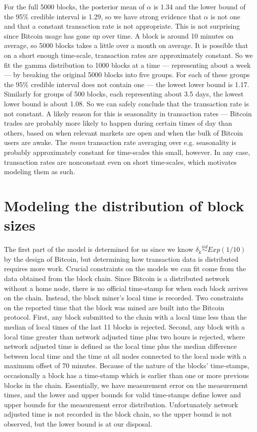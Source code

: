 \documentclass{article}
\begin{document}
For the full 5000 blocks, the posterior mean of $\alpha$ is 1.34 and the lower bound of the 95\% credible interval is 1.29, so we have strong evidence that $\alpha$ is not one and that a constant transaction rate is not appropriate. This is not surprising since Bitcoin usage has gone up over time. A block is around 10 minutes on average, so 5000 blocks takes a little over a month on average. It is possible that on a short enough time-scale, transaction rates are approximately constant. So we fit the gamma distribution to 1000 blocks at a time --- representing about a week --- by breaking the original 5000 blocks into five groups. For each of these groups the 95\% credible interval does not contain one --- the lowest lower bound is 1.17. Similarly for groups of 500 blocks, each representing about 3.5 days, the lowest lower bound is about 1.08. So we can safely conclude that the transaction rate is not constant. A likely reason for this is seasonality in transaction rates --- Bitcoin trades are probably more likely to happen during certain times of day than others, based on when relevant markets are open and when the bulk of Bitcoin users are awake. The {\it mean} transaction rate averaging over e.g. seasonality is probably approximately constant for time-scales this small, however. In any case, transaction rates are nonconstant even on short time-scales, which motivates modeling them as such.

\section{Modeling the distribution of block sizes}

The first part of the model is determined for us since we know $\delta_k\stackrel{iid}{\sim} Exp(1/10)$ by the design of Bitcoin, but determining how transaction data is distributed requires more work. Crucial constraints on the models we can fit come from the data obtained from the block chain. Since Bitcoin is a distributed network without a home node, there is no official time-stamp for when each block arrives on the chain. Instead, the block miner's local time is recorded. Two constraints on the reported time that the block was mined are built into the Bitcoin protocol. First, any block submitted to the chain with a local time less than the median of local times of the last 11 blocks is rejected. Second, any block with a local time greater than network adjusted time plus two hours is rejected, where network adjusted time is defined as the local time plus the median difference between local time and the time at all nodes connected to the local node with a maximum offset of 70 minutes. Because of the nature of the blocks' time-stamps, occasionally a block has a time-stamp which is earlier than one or more previous blocks in the chain. Essentially, we have measurement error on the measurement times, and the lower and upper bounds for valid time-stamps define lower and upper bounds for the measurement error distribution. Unfortunately network adjusted time is not recorded in the block chain, so the upper bound is not observed, but the lower bound is at our disposal.
\end{document}
